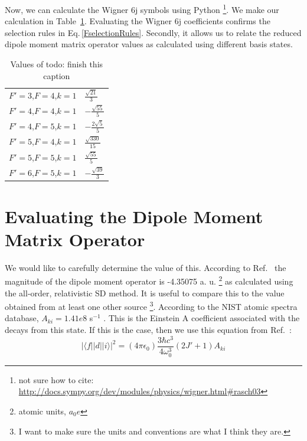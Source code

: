 Now, we can calculate the Wigner 6j symbols using Python \footnote{not sure how to cite: \url{http://docs.sympy.org/dev/modules/physics/wigner.html\#rasch03}}. We make our calculation in Table\, \ref{coefficient_calculated}. Evaluating the Wigner 6j coefficients confirms the selection rules in Eq.\,\ref{FselectionRules}. Secondly, it allows us to relate the reduced dipole moment matrix operator values as calculated using different basis states.

\begin{table}[h!]
\centering
\begin{tabular}{|c|l|}
\hline
$F'=3$,$F=4$,$k=1$&$\frac{ \sqrt{21}}{3}$\\ 
$F'=4$,$F=4$,$k=1$&$- \frac{\sqrt{55}}{5}$ \\ 
$F'=4$,$F=5$,$k=1$&$- \frac{2\sqrt{5}}{5}$\\ 
$F'=5$,$F=4$,$k=1$&$\frac{\sqrt{330}}{15}$\\ 
$F'=5$,$F=5$,$k=1$&$\frac{\sqrt{55}}{5}$\\ 
$F'=6$,$F=5$,$k=1$&$- \frac{\sqrt{39}}{3}$\\ 
\hline
\end{tabular}
\caption{Values of 
todo: finish this caption}
\label{coefficient_calculated}
\end{table}

\section{Evaluating the Dipole Moment Matrix Operator}
We would like to carefully determine the value of this. According to Ref.\ \cite{safronova2photon} the magnitude of the dipole moment operator is -4.35075 a. u. \footnote{atomic units, $a_0 e$} as calculated using the all-order, relativistic SD method. It is useful to compare this to the value obtained from at least one other source \footnote{I want to make sure the units and conventions are what I think they are.}. According to the NIST atomic spectra database, $A_{ki}=1.41e8$ s$^{-1}$ \cite{NISTasd}. This is the Einstein A coefficient associated with the decays from this state. If this is the case, then we use this equation from Ref.\ \cite{demilleBudkerKimball}:  
\begin{equation}
|\langle f ||d|| i \rangle|^2 = (4 \pi \epsilon_0) \frac{3 \hbar c^3}{4 \omega_0^3} (2 J'+1) A_{ki}\label{budkerAeqn} 
\end{equation}

